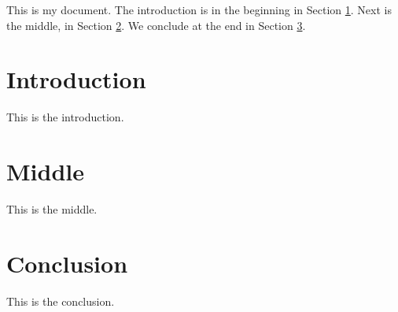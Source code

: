 \documentclass[11pt]{article}
\begin{document}
This is my document.
The introduction is in the beginning in Section \ref{sec:intro}.
Next is the middle, in Section \ref{sec:middle}.
We conclude at the end in Section \ref{sec:conc}.

\section{Introduction} \label{sec:intro}

This is the introduction.

\section{Middle} \label{sec:middle}

This is the middle.

\section{Conclusion} \label{sec:conc}

This is the conclusion.
\end{document}
